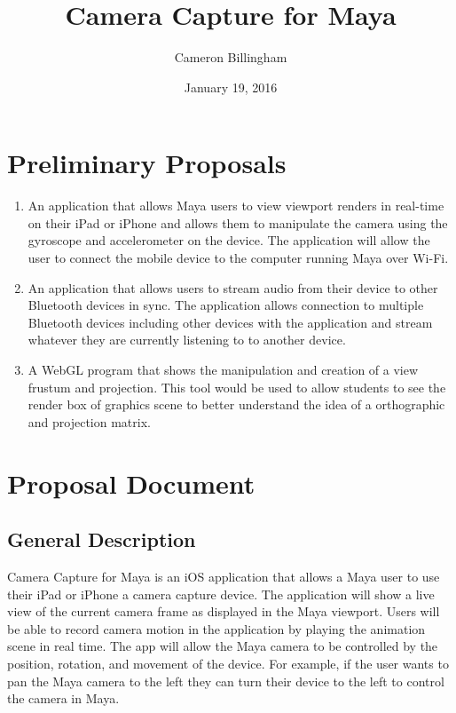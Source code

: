 \documentclass[11pt]{article}
\title{Camera Capture for Maya}
\author{Cameron Billingham}
\date{January 19, 2016}
\numberwithin{page}{section}%
\begin{document}
\maketitle
\thispagestyle{empty}
\pagebreak

\tableofcontents
\thispagestyle{empty}
\pagebreak

\section{Preliminary Proposals}

\begin{enumerate}
\item
An application that allows Maya users to view viewport renders in real-time on their iPad or iPhone and allows them to manipulate the camera using the gyroscope and accelerometer on the device. The application will allow the user to connect the mobile device to the computer running Maya over Wi-Fi.
\item
An application that allows users to stream audio from their device to other Bluetooth devices in sync. The application allows connection to multiple Bluetooth devices including other devices with the application and stream whatever they are currently listening to to another device.
\item
A WebGL program that shows the manipulation and creation of a view frustum and projection. This tool would be used to allow students to see the render box of graphics scene to better understand the idea of a orthographic and projection matrix.
\end{enumerate}

\section{Proposal Document}
\subsection{General Description}
Camera Capture for Maya is an iOS application that allows a Maya user to use their iPad or iPhone a camera capture device. The application will show a live view of the current camera frame as displayed in the Maya viewport. Users will be able to record camera motion in the application by playing the animation scene in real time. The app will allow the Maya camera to be controlled by the position, rotation, and movement of the device. For example, if the user wants to pan the Maya camera to the left they can turn their device to the left to control the camera in Maya. 
\end{document}
